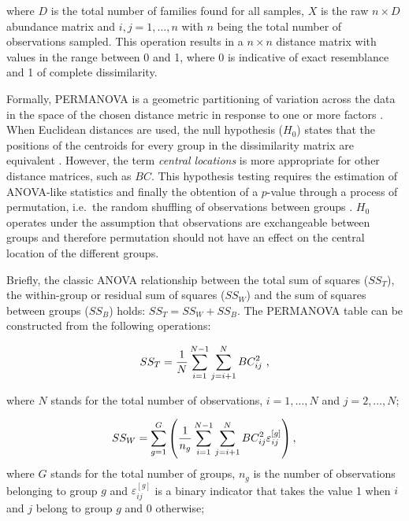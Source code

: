 \documentclass[
  openany]{book}
\begin{document}
where \(D\) is the total number of families found for all samples, \(X\) is the raw \(n \times D\) abundance matrix and \(i,j = 1, ..., n\) with \(n\) being the total number of observations sampled. This operation results in a \(n\times n\) distance matrix with values in the range between 0 and 1, where 0 is indicative of exact resemblance and 1 of complete dissimilarity.

Formally, PERMANOVA is a geometric partitioning of variation across the data in the space of the chosen distance metric in response to one or more factors \autocite{Anderson2017}. When Euclidean distances are used, the null hypothesis (\(H_0\)) states that the positions of the centroids for every group in the dissimilarity matrix are equivalent \autocite{Anderson2013}. However, the term \emph{central locations} is more appropriate for other distance matrices, such as \(BC\). This hypothesis testing requires the estimation of ANOVA-like statistics and finally the obtention of a \(p\)-value through a process of permutation, i.e.~the random shuffling of observations between groups \autocite{Anderson2001}. \(H_0\) operates under the assumption that observations are exchangeable between groups and therefore permutation should not have an effect on the central location of the different groups.

Briefly, the classic ANOVA relationship between the total sum of squares (\(SS_T\)), the within-group or residual sum of squares (\(SS_W\)) and the sum of squares between groups (\(SS_B\)) holds: \(SS_T = SS_W + SS_B\). The PERMANOVA table can be constructed from the following operations:

\begin{equation} 
  SS_T = \frac{1}{N} \sum^{N-1}_{i=1}\sum_{j = i + 1}^N BC^2_{ij}\text{ ,}\\
  \label{eq:SST}
\end{equation}

where \(N\) stands for the total number of observations, \(i = 1,\ldots,N\) and \(j = 2, \ldots, N\);

\begin{equation} 
  SS_W = \sum^G_{g=1}\left(\frac{1}{n_g} \sum^{N-1}_{i=1}\sum_{j = i + 1}^N BC^2_{ij}\varepsilon^{[g]}_{ij}\right),\\
  \label{eq:SSW}
\end{equation}
where \(G\) stands for the total number of groups, \(n_g\) is the number of observations belonging to group \(g\) and \(\varepsilon^{[g]}_{ij}\) is a binary indicator that takes the value 1 when \(i\) and \(j\) belong to group \(g\) and 0 otherwise;
\end{document}
